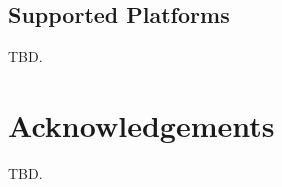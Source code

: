 \subsection{Supported Platforms}
\label{ciov2:sote0:ssup0}

TBD.

\section{Acknowledgements}
\label{ciov2:sack0}

TBD.


